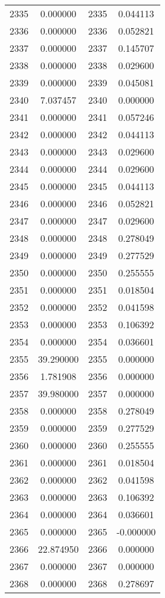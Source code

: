 \documentclass[12pt]{article}
\begin{document}
\begin{longtable}{@{}cccc@{}}
2335 & 0.000000 & 2335 & 0.044113 \\
2336 & 0.000000 & 2336 & 0.052821 \\
2337 & 0.000000 & 2337 & 0.145707 \\
2338 & 0.000000 & 2338 & 0.029600 \\
2339 & 0.000000 & 2339 & 0.045081 \\
2340 & 7.037457 & 2340 & 0.000000 \\
2341 & 0.000000 & 2341 & 0.057246 \\
2342 & 0.000000 & 2342 & 0.044113 \\
2343 & 0.000000 & 2343 & 0.029600 \\
2344 & 0.000000 & 2344 & 0.029600 \\
2345 & 0.000000 & 2345 & 0.044113 \\
2346 & 0.000000 & 2346 & 0.052821 \\
2347 & 0.000000 & 2347 & 0.029600 \\
2348 & 0.000000 & 2348 & 0.278049 \\
2349 & 0.000000 & 2349 & 0.277529 \\
2350 & 0.000000 & 2350 & 0.255555 \\
2351 & 0.000000 & 2351 & 0.018504 \\
2352 & 0.000000 & 2352 & 0.041598 \\
2353 & 0.000000 & 2353 & 0.106392 \\
2354 & 0.000000 & 2354 & 0.036601 \\
2355 & 39.290000 & 2355 & 0.000000 \\
2356 & 1.781908 & 2356 & 0.000000 \\
2357 & 39.980000 & 2357 & 0.000000 \\
2358 & 0.000000 & 2358 & 0.278049 \\
2359 & 0.000000 & 2359 & 0.277529 \\
2360 & 0.000000 & 2360 & 0.255555 \\
2361 & 0.000000 & 2361 & 0.018504 \\
2362 & 0.000000 & 2362 & 0.041598 \\
2363 & 0.000000 & 2363 & 0.106392 \\
2364 & 0.000000 & 2364 & 0.036601 \\
2365 & 0.000000 & 2365 & -0.000000 \\
2366 & 22.874950 & 2366 & 0.000000 \\
2367 & 0.000000 & 2367 & 0.000000 \\
2368 & 0.000000 & 2368 & 0.278697 \\

\end{longtable}
\end{document}
